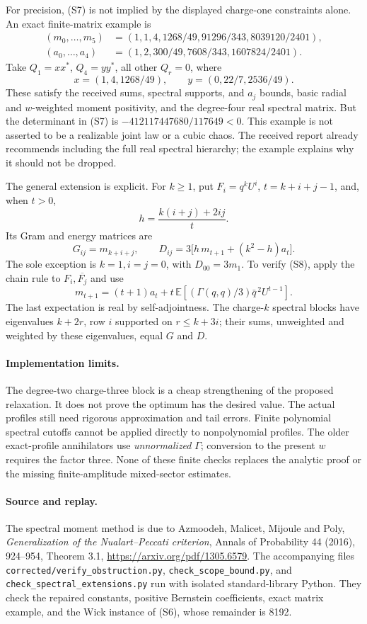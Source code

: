 For precision, (S7) is not implied by the displayed charge-one constraints
alone. An exact finite-matrix example is
\begin{align*}
 (m_0,\ldots,m_5)&=(1,1,4,1268/49,91296/343,8039120/2401),\\
 (a_0,\ldots,a_4)&=(1,2,300/49,7608/343,1607824/2401).
\end{align*}
Take $Q_1=xx^*$, $Q_4=yy^*$, all other $Q_r=0$, where
\[
 x=(1,4,1268/49),\qquad y=(0,22/7,2536/49).
\]
These satisfy the received sums, spectral supports, and $a_j$ bounds,
basic radial and $w$-weighted moment positivity, and the degree-four real
spectral matrix. But the determinant in (S7) is
$-412117447680/117649<0$.
This example is not asserted to be a realizable joint law or a cubic chaos.
The received report already recommends including the full real spectral
hierarchy; the example explains why it should not be dropped.

The general extension is explicit. For $k\ge1$, put $F_i=q^kU^i$,
$t=k+i+j-1$, and, when $t>0$,
\[
 h=\frac{k(i+j)+2ij}{t}.
\]
Its Gram and energy matrices are
\[
 G_{ij}=m_{k+i+j},\qquad
 D_{ij}=3\bigl[h\,m_{t+1}+(k^2-h)a_t\bigr].
 \tag{S8}
\]
The sole exception is $k=1,i=j=0$, with $D_{00}=3m_1$.
To verify (S8), apply the chain rule to $F_i,\overline{F_j}$ and use
\[
 m_{t+1}=(t+1)a_t+
 t\,\mathbb E[(\Gamma(q,q)/3)\bar q^{\,2}U^{t-1}].
\]
The last expectation is real by self-adjointness. The charge-$k$ spectral
blocks have eigenvalues $k+2r$, row $i$ supported on $r\le k+3i$;
their sums, unweighted and weighted by these eigenvalues, equal $G$ and $D$.

\paragraph{Implementation limits.}
The degree-two charge-three block is a cheap strengthening of the proposed
relaxation. It does not prove the optimum has the desired value.
The actual profiles still need rigorous approximation and tail errors.
Finite polynomial spectral cutoffs cannot be applied directly to
nonpolynomial profiles. The older exact-profile annihilators use
\emph{unnormalized} $\Gamma$; conversion to the present $w$ requires the
factor three. None of these finite checks replaces the analytic proof or
the missing finite-amplitude mixed-sector estimates.

\paragraph{Source and replay.}
The spectral moment method is due to Azmoodeh, Malicet, Mijoule and Poly,
\emph{Generalization of the Nualart--Peccati criterion},
Annals of Probability 44 (2016), 924--954, Theorem 3.1,
\url{https://arxiv.org/pdf/1305.6579}.
The accompanying files \texttt{corrected/verify\_obstruction.py},
\texttt{check\_scope\_bound.py}, and
\texttt{check\_spectral\_extensions.py} run with isolated standard-library
Python. They check the repaired constants, positive Bernstein coefficients,
exact matrix example, and the Wick instance of (S6), whose remainder is 8192.

